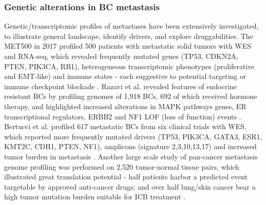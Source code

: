 \subsubsection{Genetic alterations in BC metastasis}

Genetic/transcriptomic profiles of metastases have been extensively investigated, to illustrate general landscape, identify drivers, and explore druggabilities. The MET500 in 2017 profiled 500 patients with metastatic solid tumors with WES and RNA-seq, which revealed frequently mutated genes (TP53, CDKN2A, PTEN, PIK3CA, RB1), heterogeneous transcriptomic phenotypes (proliferative and EMT-like) and immune states - each suggestive to potential targeting or immune checkpoint blockade \citep{robinson2017integrative}. Razavi et al. revealed features of endocrine resistant BCs by profiling genomes of 1,918 BCs, 692 of which received hormone therapy, and highlighted increased alterations in MAPK pathways genes, ER transcriptional regulators, ERBB2 and NF1 LOF (loss of function) events \citep{razavi2018genomic}.  Bertucci et al. profiled 617 metastatic BCs from six clinical trials with WES, which reported more frequently mutated drivers (TP53, PIK3CA, GATA3, ESR1, KMT2C, CDH1, PTEN, NF1), amplicons (signature 2,3,10,13,17) and increased tumor burden in metastasis \citep{bertucci2019genomic}. Another large scale study of pan-cancer metastasis genome profiling was performed on 2,520 tumor-normal tissue pairs, which illustrated great translation potential - half patients harbor a predicted event targetable by approved anti-cancer drugs; and over half lung/skin cancer bear a high tumor mutation burden suitable for ICB treatment \citep{priestley2019pan}. 

